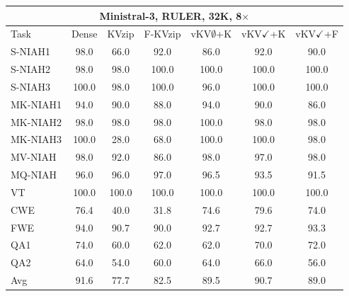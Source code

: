 \begin{tabular}{lcccccc}
\toprule
\multicolumn{7}{c}{Ministral-3, RULER, 32K, 8$\times$} \\
\midrule
Task & Dense & KVzip & F-KVzip & vKV$\emptyset$+K & vKV$\checkmark$+K & vKV$\checkmark$+F \\
\midrule
S-NIAH1 & 98.0 & 66.0 & 92.0 & 86.0 & 92.0 & 90.0 \\
S-NIAH2 & 98.0 & 98.0 & 100.0 & 100.0 & 100.0 & 100.0 \\
S-NIAH3 & 100.0 & 98.0 & 100.0 & 96.0 & 100.0 & 100.0 \\
MK-NIAH1 & 94.0 & 90.0 & 88.0 & 94.0 & 90.0 & 86.0 \\
MK-NIAH2 & 98.0 & 98.0 & 98.0 & 100.0 & 98.0 & 98.0 \\
MK-NIAH3 & 100.0 & 28.0 & 68.0 & 100.0 & 100.0 & 98.0 \\
MV-NIAH & 98.0 & 92.0 & 86.0 & 98.0 & 97.0 & 98.0 \\
MQ-NIAH & 96.0 & 96.0 & 97.0 & 96.5 & 93.5 & 91.5 \\
VT & 100.0 & 100.0 & 100.0 & 100.0 & 100.0 & 100.0 \\
CWE & 76.4 & 40.0 & 31.8 & 74.6 & 79.6 & 74.0 \\
FWE & 94.0 & 90.7 & 90.0 & 92.7 & 92.7 & 93.3 \\
QA1 & 74.0 & 60.0 & 62.0 & 62.0 & 70.0 & 72.0 \\
QA2 & 64.0 & 54.0 & 60.0 & 64.0 & 66.0 & 56.0 \\
\midrule
Avg & 91.6 & 77.7 & 82.5 & 89.5 & 90.7 & 89.0 \\
\bottomrule
\end{tabular}
\vspace{0.8em}

